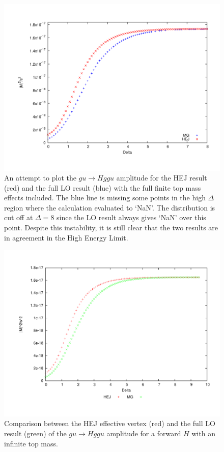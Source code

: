 \begin{figure}[t]
\centering
\includegraphics[scale=0.45]{Images/mg_instability.pdf}
\caption{An attempt to plot the $gu \to Hggu$ amplitude for the HEJ result (red) and the full LO result (blue) with the full finite top mass effects included. The blue line is missing some points in the high $\Delta$ region where the calculation evaluated to `NaN'. The distribution is cut off at $\Delta = 8$ since the LO result always gives `NaN' over this point. Despite this instability, it is still clear that the two results are in agreement in the High Energy Limit.}
\label{fig:unstable} 
\end{figure}
\begin{figure}[t]
\centering
\includegraphics[scale=0.45]{Images/ug_nextfor.pdf}
\caption{Comparison between the HEJ effective vertex (red) and the full LO result (green) of the $gu \to Hggu$ amplitude for a forward $H$ with an infinite top mass.}
\label{fig:ug_for} 
\end{figure}

